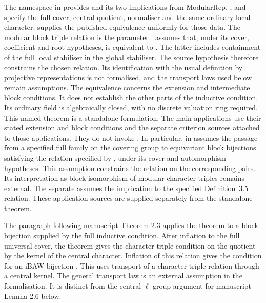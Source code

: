 \begin{implementation}
The  namespace in
 provides
 and its two implications from ModularRep.
,  and 
specify the full cover, central quotient, normaliser and
the same ordinary local character. 
supplies the published equivalence uniformly for those data.
The modular block triple relation is the parameter
. 
assumes that, under its cover, coefficient and root hypotheses,
 is equivalent to . The latter includes
containment of the full local stabiliser in the global stabiliser. The source
hypothesis therefore constrains the chosen relation. Its identification with
the usual definition by projective representations is not formalised, and
the transport laws used below remain assumptions. The equivalence concerns
the extension and intermediate block conditions. It does not establish the
other parts of the inductive condition. Its ordinary field is algebraically
closed, with no discrete valuation ring required.
This named theorem is a standalone formulation. The main applications
use their stated extension and block conditions and the separate
criterion sources attached to those applications. They do not invoke
.
In particular,  in
 assumes the passage
from a specified full family on the covering group to equivariant block
bijections satisfying the relation specified by
, under its cover and
automorphism hypotheses. This assumption constrains the relation on the
corresponding pairs. Its interpretation as block isomorphism of modular
character triples remains external. The separate
 assumes the
implication to the specified Definition~3.5 relation. These application
sources are supplied separately from the standalone theorem.
\end{implementation}

The paragraph following manuscript Theorem 2.3 applies the theorem
to a block bijection supplied by the full inductive condition.
After inflation to the full universal cover, the theorem gives the
character triple condition on the quotient by the kernel of the
central character. Inflation of this relation gives the condition
for an iBAW bijection \cite[Remark~4.4]{BroughSpath2022}.
This uses transport of a character triple relation through a central
kernel. The general transport law is an external assumption in the
formalisation. It is distinct from the central $\ell$-group argument
for manuscript Lemma 2.6 below.

